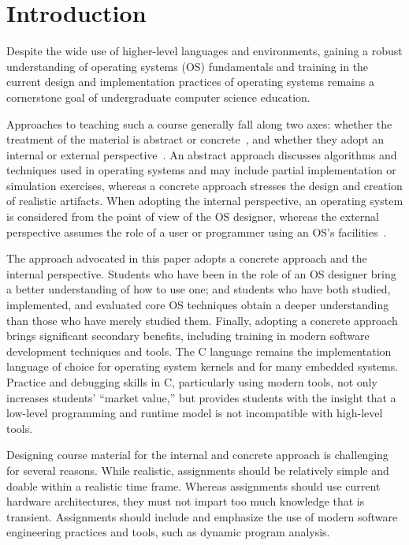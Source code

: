 \section{Introduction}
\label{sec:intro}

Despite the wide use of higher-level languages and environments, gaining a robust
understanding of operating systems (OS) fundamentals and training in the current design and
implementation practices of operating systems remains a cornerstone goal of 
undergraduate computer science education.

Approaches to teaching such a course generally fall along two axes: 
whether the treatment of the material is abstract or 
concrete~\cite{Hovemeyer2004Running}, and whether they adopt an
internal or external perspective~\cite{Deitel2003Operating}.
An abstract approach discusses algorithms and techniques used in operating 
systems and may include partial implementation or simulation exercises,
whereas a concrete approach stresses the design and creation of 
realistic artifacts.
When adopting the internal perspective, an operating system is considered
from the point of view of the OS designer, whereas the external perspective 
assumes the role of a user or programmer using an OS's 
facilities~\cite{Bryant2002Computer}.

The approach advocated in this paper adopts a concrete approach and the internal
perspective.  Students who have been in the role of an
OS designer bring a better understanding of how to use one; and students
who have both studied, implemented, and evaluated core OS techniques obtain 
a deeper understanding than those who have merely studied them.
Finally, adopting a concrete approach brings significant secondary
benefits, including training in modern software development techniques
and tools.  The C language remains the implementation language of choice
for operating system kernels and for many embedded systems.
Practice and debugging skills in C, particularly using modern tools,
not only increases students' ``market value,'' but provides students with
the insight that a low-level programming and runtime model is not incompatible
with high-level tools.

Designing course material for the internal and concrete 
approach is challenging for several reasons.  While realistic, assignments should be
relatively simple and doable within a realistic time frame.  
Whereas assignments should use current hardware architectures, 
they must not impart too much knowledge that is transient.
Assignments should include and emphasize the use of modern software 
engineering practices and tools, such as dynamic program analysis.

